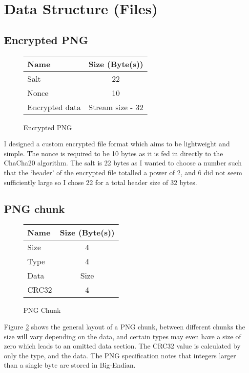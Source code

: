 \documentclass{report}
\begin{document}
\section{Data Structure (Files)}

\subsection{Encrypted PNG}

\begin{figure}[!htb]
\begin{center}
  \begin{tabular}{| l | c |}
   \hline
   Name & Size (Byte(s)) \\
   \hline
   Salt                & 22 \\
   Nonce               & 10 \\
   Encrypted data      & Stream size - 32 \\
   \hline
  \end{tabular}
\end{center}
\caption{Encrypted PNG}
\label{table:png_enc}
\end{figure}
\noindent
I designed a custom encrypted file format which aims to be lightweight and simple. The nonce is required to be 10 bytes as it is fed in directly to the ChaCha20 algorithm. The salt is 22 bytes as I wanted to choose a number such that the `header' of the encrypted file totalled a power of 2, and 6 did not seem sufficiently large so I chose 22 for a total header size of 32 bytes.

\subsection{PNG chunk}

\begin{figure}[!htb]
\begin{center}
  \begin{tabular}{| l | c |}
   \hline
   Name & Size (Byte(s)) \\
   \hline
   Size                & 4 \\
   Type                & 4 \\
   Data                & Size \\
   CRC32               & 4 \\
   \hline
  \end{tabular}
\end{center}
\caption{PNG Chunk}
\label{table:png_chunk}
\end{figure}
\noindent
Figure \ref{table:png_chunk} shows the general layout of a PNG chunk, between different chunks the size will vary depending on the data, and certain types may even have a size of zero which leads to an omitted data section. The CRC32 value is calculated by only the type, and the data. The PNG specification notes that integers larger than a single byte are stored in Big-Endian.
\end{document}
